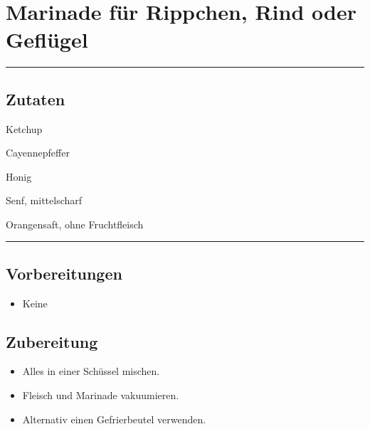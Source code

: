 \section*{Marinade für Rippchen, Rind oder Geflügel}

\bigbreak
\rule{\textwidth}{0.4pt}

\subsection*{Zutaten}

\begin{description}[align=right,leftmargin=!,labelwidth=\widthof{\bfseries xxPrisen}]
    \item[300g] Ketchup
    \item[1 TL] Cayennepfeffer
    \item[50g] Honig
    \item[35g] Senf, mittelscharf
    \item[75ml] Orangensaft, ohne Fruchtfleisch
\end{description}


\rule{\textwidth}{0.4pt}


\subsection*{Vorbereitungen}

\begin{itemize}
    \item Keine
\end{itemize}


\bigbreak
\subsection*{Zubereitung}

\begin{itemize}
    \item Alles in einer Schüssel mischen.
    \item Fleisch und Marinade vakuumieren.
    \item Alternativ einen Gefrierbeutel verwenden.
\end{itemize}
